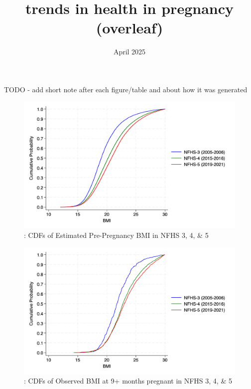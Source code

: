 \documentclass{article}
\title{trends in health in pregnancy (overleaf)}
\date{April 2025}
\begin{document}
\maketitle



TODO
- add short note after each figure/table and about how it was generated
\begin{figure}[H]
    \centering
    \includegraphics[width=\textwidth]{figures/cdf prepregnancy bmi.png}
    \caption{: CDFs of Estimated Pre-Pregnancy BMI in NFHS 3, 4, \& 5}
    
\end{figure}



\begin{figure}[H]
    \centering
    \includegraphics[width=\textwidth]{figures/cdf nine months bmi.png}
    \caption{: CDFs of Observed BMI at 9+ months pregnant in NFHS 3, 4, \& 5}
    
\end{figure}
\end{document}
